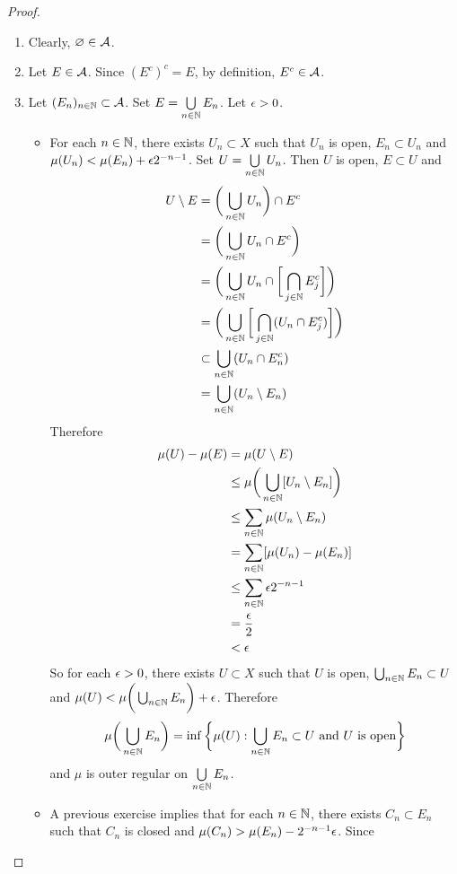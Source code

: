 \documentclass{book}
\begin{document}
	\begin{proof}\ 
		\begin{enumerate}
			\item Clearly, $\varnothing \in \mathcal{A}$.
			\item Let $E \in \mathcal{A}$. Since $(E^c)^c = E$, by definition, $E^c \in \mathcal{A}$. 
			\item Let $(E_n)_{n \in \mathbb{N}} \subset \mathcal{A}$. Set $E = \bigcup\limits_{n \in \mathbb{N}} E_n$. Let $\epsilon >0$. 
			\begin{itemize}
				\item For each $n \in \mathbb{N}$, there exists $U_n \subset X$ such that $U_n$ is open, $E_n \subset U_n$ and $\mu(U_n) < \mu(E_n) + \epsilon 2^{-n - 1 }$. Set $U = \bigcup\limits_{n\in\mathbb{N}} U_n$. Then $U$ is open, $E \subset U$ and 
				\begin{align*} 
					U \setminus E
					&= \bigg( \bigcup_{n \in \mathbb{N}} U_n \bigg) \cap  E^c \\
					&= \bigg( \bigcup_{n \in \mathbb{N}} U_n \cap E^c \bigg)  \\
					&= \bigg( \bigcup_{n \in \mathbb{N}} U_n \cap \bigg[ \bigcap_{j \in \mathbb{N}} E_j^c \bigg] \bigg) \\
					&= \bigg( \bigcup_{n \in \mathbb{N}} \bigg [ \bigcap_{j \in \mathbb{N}} (U_n \cap E_j^c)\bigg ]  \bigg) \\
					& \subset \bigcup_{n \in \mathbb{N}} (U_n \cap E_n^c)  \\
					&= \bigcup_{n \in \mathbb{N}} (U_n \setminus E_n) 
				\end{align*}
				Therefore
				\begin{align*}
					\mu(U) - \mu(E)
					&= \mu(U \setminus E) \\
					& \leq \mu \bigg(\bigcup_{n \in \mathbb{N}} [U_n \setminus E_n] \bigg) \\
					& \leq \sum_{n \in \mathbb{N}} \mu(U_n \setminus E_n) \\
					&= \sum_{n \in \mathbb{N}} [\mu(U_n) - \mu(E_n)] \\
					& \leq \sum_{n \in \mathbb{N}} \epsilon 2^{-n-1} \\
					&= \frac{\epsilon}{2} \\
					& < \epsilon
				\end{align*}
				So for each $\epsilon >0$, there exists $U \subset X$ such that $U$ is open, $\bigcup_{n \in \mathbb{N}}E_n \subset U$ and $\mu(U) < \mu \bigg( \bigcup_{n \in \mathbb{N}} E_n \bigg) + \epsilon$. Therefore $$\mu \bigg( \bigcup_{n \in \mathbb{N}} E_n \bigg) = \inf \bigg \{ \mu(U): \bigcup_{n \in \mathbb{N}} E_n \subset U \text{ and $U$ is open} \bigg \}$$
				and $\mu$ is outer regular on $\bigcup\limits_{n \in \mathbb{N}} E_n$.
				\item A previous exercise implies that for each $n \in \mathbb{N}$, there exists $C_n \subset E_n$ such that $C_n$ is closed and $\mu(C_n) > \mu(E_n) - 2^{-n-1}\epsilon$. Since 

\end{itemize}
\end{enumerate}
\end{proof}
\end{document}
